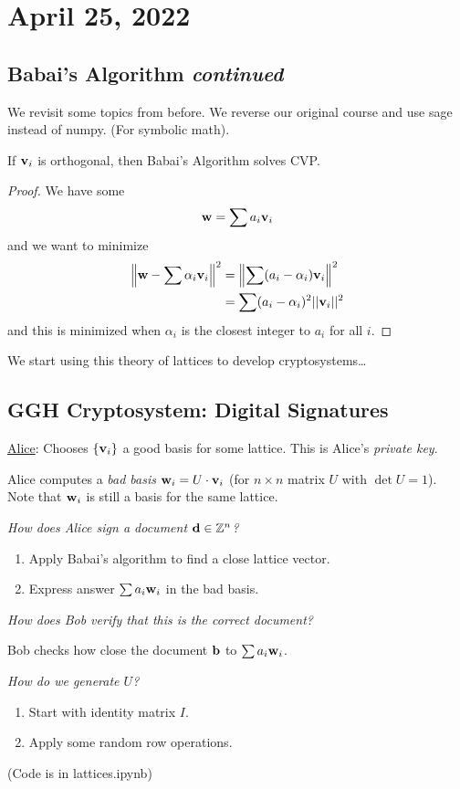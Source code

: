 \section{April 25, 2022}
\subsection{Babai's Algorithm \emph{continued}}

\recall We revisit some topics from before. We reverse our original course and use \textsf{sage} instead of \textsf{numpy}. (For symbolic math).



\begin{proposition}
    If $\mathbf{v}_i$ is orthogonal, then Babai's Algorithm solves CVP.
\end{proposition}
\begin{proof}
    We have some
    \[\mathbf{w} = \sum a_i\mathbf{v}_i\]
    and we want to minimize
    \begin{align*}
        \left\lVert \mathbf{w} - \sum \alpha_i\mathbf{v}_i\right\rVert^2
         & = \left\lVert \sum(a_i - \alpha_i)\mathbf{v}_i\right\rVert^2 \\
         & = \sum (a_i - \alpha_i)^2||\mathbf{v}_i||^2
    \end{align*}
    and this is minimized when $\alpha_i$ is the closest integer to $a_i$ for all $i$.
\end{proof}

We start using this theory of lattices to develop cryptosystems\dots

\subsection{GGH Cryptosystem: Digital Signatures}
\ul{Alice}: Chooses $\{\mathbf{v}_i\}$ a good basis for some lattice. This is Alice's \emph{private key}.

Alice computes a \emph{bad basis} $\mathbf{w}_i = U\cdot \mathbf{v}_i$ (for $n\times n$ matrix $U$ with $\det U = 1$). Note that $\mathbf{w}_i$ is still a basis for the same lattice.

\emph{How does Alice sign a document $\mathbf{d}\in\mathbb Z^n$? }
\begin{enumerate}
    \item Apply Babai's algorithm to find a close lattice vector.
    \item Express answer $\sum a_i\mathbf{w}_i$ in the bad basis.
\end{enumerate}

\emph{How does Bob verify that this is the correct document? }

Bob checks how close the document $\mathbf{b}$ to $\sum a_i \mathbf{w}_i$.

\emph{How do we generate $U$?}
\begin{enumerate}
    \item Start with identity matrix $I$.
    \item Apply some random row operations.
\end{enumerate}

(Code is in \textsf{lattices.ipynb})